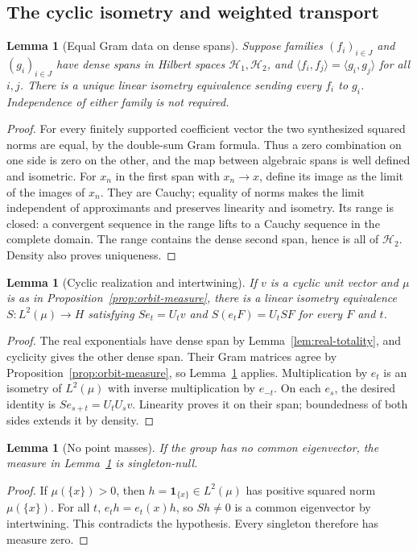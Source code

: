 \documentclass[reqno,a4paper,12pt]{amsart}
\newtheorem{lemma}[theorem]{Lemma}
\theoremstyle{definition}
\newcommand{\ip}[2]{\langle #1,#2\rangle}
\begin{document}
\subsection{The cyclic isometry and weighted transport}
\begin{lemma}[Equal Gram data on dense spans]\label{lem:equal-gram}
Suppose families $(f_i)_{i\in J}$ and $(g_i)_{i\in J}$ have dense
spans in Hilbert spaces $\mathcal H_1,\mathcal H_2$, and
$\ip{f_i}{f_j}=\ip{g_i}{g_j}$ for all $i,j$.
There is a unique linear isometry equivalence sending every $f_i$
to $g_i$. Independence of either family is not required.
\end{lemma}
\begin{proof}
For every finitely supported coefficient vector the two synthesized
squared norms are equal, by the double-sum Gram formula.
Thus a zero combination on one side is zero on the other, and the
map between algebraic spans is well defined and isometric.
For $x_n$ in the first span with $x_n\to x$, define its image as the
limit of the images of $x_n$. They are Cauchy; equality of norms
makes the limit independent of approximants and preserves linearity
and isometry. Its range is closed: a convergent sequence in the
range lifts to a Cauchy sequence in the complete domain.
The range contains the dense second span, hence is all of $\mathcal H_2$.
Density also proves uniqueness.
\end{proof}

\begin{lemma}[Cyclic realization and intertwining]\label{lem:cyclic-realization}
If $v$ is a cyclic unit vector and $\mu$ is as in
Proposition~\ref{prop:orbit-measure}, there is a linear isometry
equivalence $S:L^2(\mu)\to H$ satisfying
$Se_t=U_tv$ and $S(e_tF)=U_tSF$ for every $F$ and $t$.
\end{lemma}
\begin{proof}
The real exponentials have dense span by
Lemma~\ref{lem:real-totality}, and cyclicity gives the other dense
span. Their Gram matrices agree by Proposition~\ref{prop:orbit-measure},
so Lemma~\ref{lem:equal-gram} applies.
Multiplication by $e_t$ is an isometry of $L^2(\mu)$ with inverse
multiplication by $e_{-t}$. On each $e_s$, the desired identity is
$Se_{s+t}=U_tU_sv$. Linearity proves it on their span; boundedness
of both sides extends it by density.
\end{proof}

\begin{lemma}[No point masses]\label{lem:no-point-masses}
If the group has no common eigenvector, the measure in
Lemma~\ref{lem:cyclic-realization} is singleton-null.
\end{lemma}
\begin{proof}
If $\mu(\{x\})>0$, then $h=\mathbf1_{\{x\}}\in L^2(\mu)$ has positive
squared norm $\mu(\{x\})$. For all $t$,
$e_th=e_t(x)h$, so $Sh\ne0$ is a common eigenvector by intertwining.
This contradicts the hypothesis. Every singleton therefore has measure zero.
\end{proof}
\end{document}
